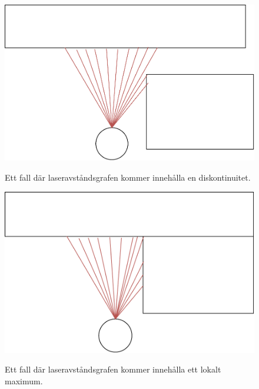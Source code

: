 \documentclass{article}
\begin{document}
\begin{figure}[H]
  \centering
  \includegraphics[scale=0.5,keepaspectratio]{LaserDiskontinuitet} \\
  \caption{Ett fall där laseravståndsgrafen kommer innehålla en diskontinuitet.}
  \label{fig:LaserDiskontinuitet}
\end{figure}

\begin{figure}[H]
  \centering
  \includegraphics[scale=0.5]{LaserLokaltMaximum} \\
  \caption{Ett fall där laseravståndsgrafen kommer innehålla ett lokalt maximum.}
  \label{fig:LaserLokaltMaximum}
\end{figure}
\end{document}
